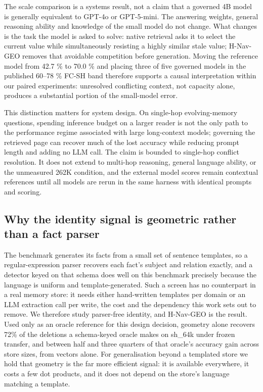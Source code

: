 \documentclass[journal=jcisd8,manuscript=article]{achemso}
\begin{document}
The scale comparison is a systems result, not a claim that a governed 4B model is generally equivalent to GPT-4o or GPT-5-mini. The answering weights, general reasoning ability and knowledge of the small model do not change. What changes is the task the model is asked to solve: native retrieval asks it to select the current value while simultaneously resisting a highly similar stale value; H-Nav-GEO removes that avoidable competition before generation. Moving the reference model from 42.7 \% to 70.0 \% and placing three of five governed models in the published 60--78 \% FC-SH band therefore supports a causal interpretation within our paired experiments: unresolved conflicting context, not capacity alone, produces a substantial portion of the small-model error.

This distinction matters for system design. On single-hop evolving-memory questions, spending inference budget on a larger reader is not the only path to the performance regime associated with large long-context models; governing the retrieved page can recover much of the lost accuracy while reducing prompt length and adding no LLM call. The claim is bounded to single-hop conflict resolution. It does not extend to multi-hop reasoning, general language ability, or the unmeasured 262K condition, and the external model scores remain contextual references until all models are rerun in the same harness with identical prompts and scoring.

\subsection{Why the identity signal is geometric rather than a fact parser}
\label{sec:parser}

The benchmark generates its facts from a small set of sentence templates, so a regular-expression parser recovers each fact's subject and relation exactly, and a detector keyed on that schema does well on this benchmark precisely because the language is uniform and template-generated. Such a screen has no counterpart in a real memory store: it needs either hand-written templates per domain or an LLM extraction call per write, the cost and the dependency this work sets out to remove. We therefore study parser-free identity, and H-Nav-GEO is the result. Used only as an oracle reference for this design decision, geometry alone recovers 72\% of the deletions a schema-keyed oracle makes on sh\_64k under frozen transfer, and between half and three quarters of that oracle's accuracy gain across store sizes, from vectors alone. For generalisation beyond a templated store we hold that geometry is the far more efficient signal: it is available everywhere, it costs a few dot products, and it does not depend on the store's language matching a template.
\end{document}
